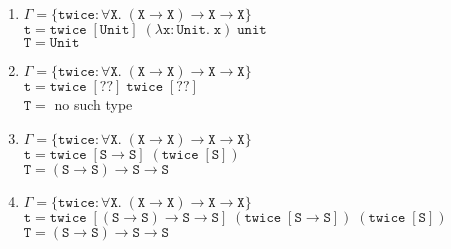 \documentclass{article}
\begin{document}
\begin{enumerate}
\begin{enumerate}
        \item $\Gamma = \{ \mathtt{twice} : \forall\mathtt{X}. \; (\mathtt{X} \to \mathtt{X}) \to \mathtt{X} \to \mathtt{X} \}$ \\
          $\mathtt{t} = \mathtt{twice} \; [\mathtt{Unit}] \; (\lambda\mathtt{x}:\mathtt{Unit}. \; \mathtt{x}) \; \mathtt{unit}$ \\
          $\mathtt{T} = \mathtt{Unit}$

        \item $\Gamma = \{ \mathtt{twice} : \forall\mathtt{X}. \; (\mathtt{X} \to \mathtt{X}) \to \mathtt{X} \to \mathtt{X} \}$ \\
          $\mathtt{t} = \mathtt{twice} \; [??] \; \mathtt{twice} \; [??]$ \\
          $\mathtt{T} = $ no such type

        \item $\Gamma = \{ \mathtt{twice} : \forall\mathtt{X}. \; (\mathtt{X} \to \mathtt{X}) \to \mathtt{X} \to \mathtt{X} \}$ \\
          $\mathtt{t} = \mathtt{twice} \; [\mathtt{S} \to \mathtt{S}] \; (\mathtt{twice} \; [\mathtt{S}])$ \\
          $\mathtt{T} = (\mathtt{S} \to \mathtt{S}) \to \mathtt{S} \to \mathtt{S}$

        \item $\Gamma = \{ \mathtt{twice} : \forall\mathtt{X}. \; (\mathtt{X} \to \mathtt{X}) \to \mathtt{X} \to \mathtt{X} \}$ \\
          $\mathtt{t} = \mathtt{twice} \; [(\mathtt{S} \to \mathtt{S}) \to \mathtt{S} \to \mathtt{S}] \; (\mathtt{twice} \; [\mathtt{S} \to \mathtt{S}]) \; (\mathtt{twice} \; [\mathtt{S}])$ \\
          $\mathtt{T} = (\mathtt{S} \to \mathtt{S}) \to \mathtt{S} \to \mathtt{S}$


        \end{enumerate}


  \end{enumerate}
\end{document}
